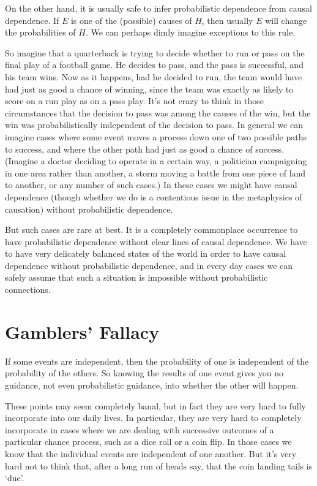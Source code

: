 On the other hand, it is usually safe to infer probabilistic dependence from causal dependence. If $E$ is one of the (possible) causes of $H$, then usually $E$ will change the probabilities of $H$. We can perhaps dimly imagine exceptions to this rule. 

So imagine that a quarterback is trying to decide whether to run or pass on the final play of a football game. He decides to pass, and the pass is successful, and his team wins. Now as it happens, had he decided to run, the team would have had just as good a chance of winning, since the team was exactly as likely to score on a run play as on a pass play. It's not crazy to think in those circumstances that the decision to pass was among the causes of the win, but the win was probabilistically independent of the decision to pass. In general we can imagine cases where some event moves a process down one of two possible paths to success, and where the other path had just as good a chance of success. (Imagine a doctor deciding to operate in a certain way, a politician campaigning in one area rather than another, a storm moving a battle from one piece of land to another, or any number of such cases.) In these cases we might have causal dependence (though whether we do is a contentious issue in the metaphysics of causation) without probabilistic dependence.

But such cases are rare at best. It is a completely commonplace occurrence to have probabilistic dependence without clear lines of causal dependence. We have to have very delicately balanced states of the world in order to have causal dependence without probabilistic dependence, and in every day cases we can safely assume that such a situation is impossible without probabilistic connections.

\section{Gamblers' Fallacy}
If some events are independent, then the probability of one is independent of the probability of the others. So knowing the results of one event gives you no guidance, not even probabilistic guidance, into whether the other will happen.

These points may seem completely banal, but in fact they are very hard to fully incorporate into our daily lives. In particular, they are very hard to completely incorporate in cases where we are dealing with successive outcomes of a particular chance process, such as a dice roll or a coin flip. In those cases we know that the individual events are independent of one another. But it's very hard not to think that, after a long run of heads say, that the coin landing tails is `due'.

